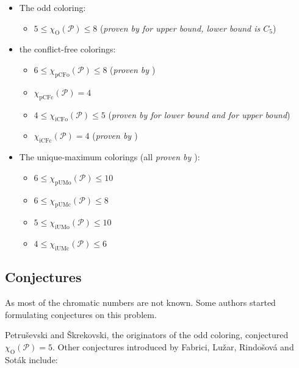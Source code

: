 \documentclass{article}
\begin{document}
\begin{itemize}
	\item The odd coloring:
	\begin{itemize}
		\item $5 \leq \chi_{\mathrm{O}}(\mathcal{P}) \leq 8$ (\textit{proven by \cite{petr2023odd} for upper bound, lower bound is $\mathit{C_5}$})
	\end{itemize}
	
	\item the conflict-free colorings:
	\begin{itemize}
		\item $6 \leq \chi_{\mathrm{pCFo}}(\mathcal{P}) \leq 8$ (\textit{proven by \cite{fabrici2023proper}})
		\item $\chi_{\mathrm{pCFc}}(\mathcal{P}) = 4$
		\item $4 \le \chi_{\mathrm{iCFo}}(\mathcal{P}) \le 5$ (\textit{proven by \cite{abel2018conflict} for lower bound and \cite{huang2020short} for upper bound})
		\item $\chi_{\mathrm{iCFc}}(\mathcal{P}) = 4$ (\textit{proven by \cite{Malik2023thesis}})
	\end{itemize}
	
	\item The unique-maximum colorings (all \textit{proven by \cite{fabrici2023proper}}):
	\begin{itemize}
		\item $6 \leq \chi_{\mathrm{pUMo}}(\mathcal{P}) \leq 10$
		\item $6 \leq \chi_{\mathrm{pUMc}}(\mathcal{P}) \leq 8$
		\item $5 \le \chi_{\mathrm{iUMo}}(\mathcal{P}) \le 10$
		\item $4 \le \chi_{\mathrm{iUMc}}(\mathcal{P}) \le 6$
	\end{itemize}
\end{itemize}



\subsection{Conjectures}
\label{sect:Conjectures}

As most of the chromatic numbers are not known. Some authors started formulating conjectures on this problem.

Petruševski and Škrekovski, the originators of the odd coloring, conjectured $\chi_{\mathrm{O}}(\mathcal{P}) = 5$. Other conjectures introduced by Fabrici, Lužar, Rindošová and Soták \cite{fabrici2023proper} include:
\end{document}
